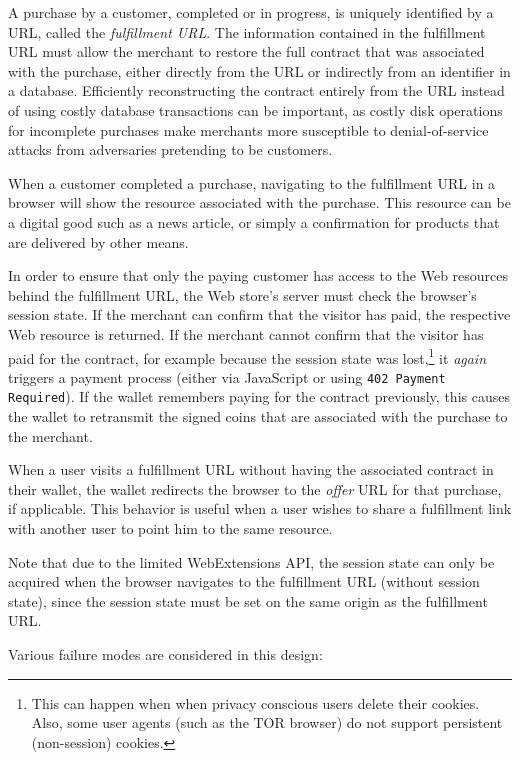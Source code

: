 \documentclass{llncs}
\begin{document}
A purchase by a customer, completed or in progress, is uniquely
identified by a URL, called the \emph{fulfillment URL}.  The
information contained in the fulfillment URL must allow the merchant
to restore the full contract that was associated with the purchase,
either directly from the URL or indirectly from an identifier in a
database.  Efficiently reconstructing the contract entirely from the
URL instead of using costly database transactions can be important, as
costly disk operations for incomplete purchases make merchants
more susceptible to denial-of-service attacks from adversaries
pretending to be customers.

When a customer completed a purchase, navigating to the fulfillment
URL in a browser will show the resource associated with the purchase.
This resource can be a digital good such as a news article, or simply
a confirmation for products that are delivered by other means.

In order to ensure that only the paying customer has access to the Web
resources behind the fulfillment URL, the Web store's server must
check the browser's session state.  If the merchant can confirm that
the visitor has paid, the respective Web resource is returned.  If the
merchant cannot confirm that the visitor has paid for the contract,
for example because the session state was lost,\footnote{This can
  happen when when privacy conscious users delete their cookies.
  Also, some user agents (such as the TOR browser) do not support
  persistent (non-session) cookies.} it {\em again} triggers a payment
process (either via JavaScript or using {\tt 402 Payment Required}).
If the wallet remembers paying for the contract previously, this
causes the wallet to retransmit the signed coins that are associated
with the purchase to the merchant.

When a user visits a fulfillment URL without having the associated
contract in their wallet, the wallet redirects the browser to the {\em
  offer} URL for that purchase, if applicable.  This behavior is
useful when a user wishes to share a fulfillment link with another
user to point him to the same resource.

Note that due to the limited WebExtensions API, the session
state can only be acquired when the browser navigates to
the fulfillment URL (without session state), since the session
state must be set on the same origin as the fulfillment URL.

Various failure modes are considered in this design:
\end{document}
